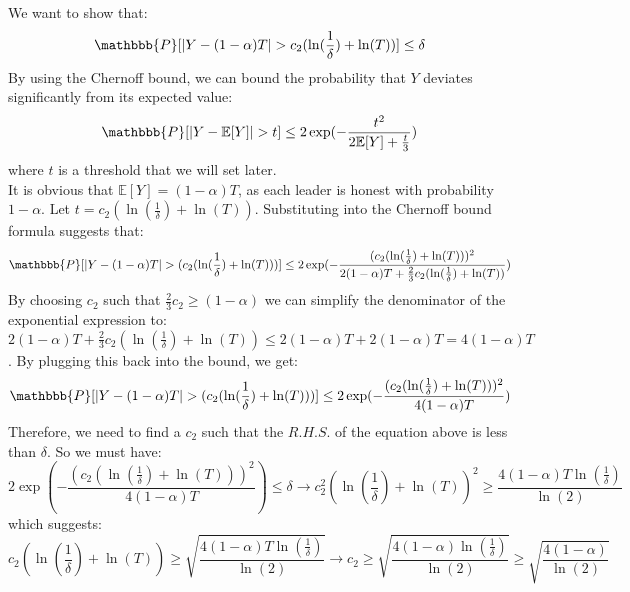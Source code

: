 \documentclass{article}
\begin{document}
\begin{enumerate}
We want to show that:
\begin{equation}
    \mathbbb{P} [|Y - (1-\alpha)T| > c_2(\ln(\frac{1}{\delta}) + \ln(T))] \leq \delta
\end{equation}
By using the Chernoff bound, we can bound the probability that $Y$ deviates significantly from its expected value:
\begin{equation}
    \mathbbb{P} [|Y - \mathbb{E}[Y]| > t] \leq 2\exp(-\frac{t^2}{2\mathbb{E}[Y] + \frac{t}{3}})
\end{equation}
where $t$ is a threshold that we will set later.\\
It is obvious that $\mathbb{E}[Y] = (1-\alpha)T$, as each leader is honest with probability $1-\alpha$. Let 
$t = c_2(\ln(\frac{1}{\delta}) + \ln(T)) $. Substituting into the Chernoff bound formula suggests that:
\begin{equation}
     \mathbbb{P} [|Y - (1-\alpha)T| > (c_2(\ln(\frac{1}{\delta}) + \ln(T)))] \leq 2\exp(-\frac{(c_2(\ln(\frac{1}{\delta}) + \ln(T)))^2}{2(1-\alpha)T + \frac{2}{3}c_2(\ln(\frac{1}{\delta}) + \ln(T))})
\end{equation}
By choosing $c_2$ such that $\frac{2}{3} c_2 \geq (1-\alpha)$ we can simplify the denominator of the exponential expression to:
$2(1 - \alpha)T + \frac{2}{3} c_2(\ln(\frac{1}{\delta}) + \ln(T)) \leq 
2(1 - \alpha)T + 2(1 - \alpha)T = 4(1 - \alpha)T
$. By plugging this back into the bound, we get:
\begin{equation}
    \mathbbb{P} [|Y - (1-\alpha)T| > (c_2(\ln(\frac{1}{\delta}) + \ln(T)))] \leq
    2\exp(-\frac{(c_2(\ln(\frac{1}{\delta}) + \ln(T)))^2}{4(1-\alpha)T}) 
\end{equation}
Therefore, we need to find a $c_2$ such that the $R.H.S.$ of the equation above is less than $\delta$. So we must have:
\begin{equation}
    2\exp(-\frac{(c_2(\ln(\frac{1}{\delta}) + \ln(T)))^2}{4(1-\alpha)T}) \leq \delta \rightarrow c_2^2 (\ln(\frac{1}{\delta}) + \ln(T))^2 \geq \frac{4(1-\alpha)T \ln(\frac{1}{\delta})}{\ln(2)}
\end{equation} which suggests:
\begin{equation}
    c_2 (\ln(\frac{1}{\delta}) + \ln(T)) \geq \sqrt{\frac{4(1-\alpha)T \ln(\frac{1}{\delta})}{\ln(2)}} \rightarrow c_2 \geq \sqrt{ \frac{4(1-\alpha)\ln(\frac{1}{\delta})}{\ln(2)}} \geq \sqrt{\frac{4(1-\alpha)}{\ln(2)}}
\end{equation}



\end{enumerate}
\end{document}
